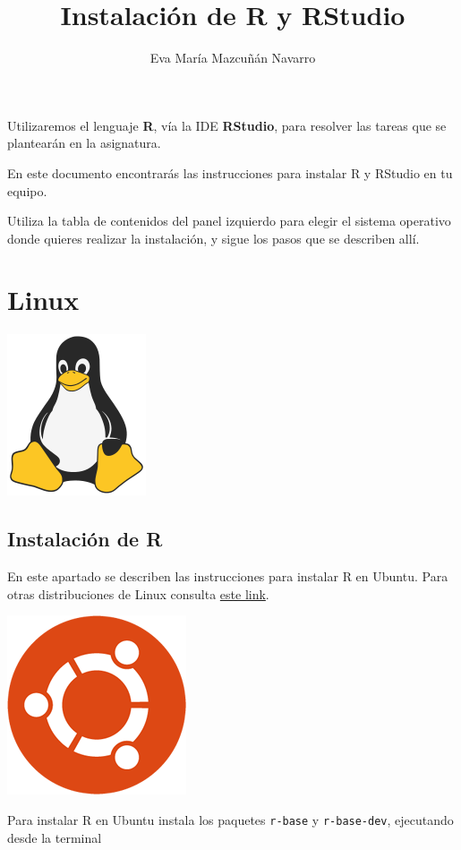 \documentclass[
  degree=mecinf,
  title=normal,
  toc=normal,
  bib=normal]{mnye}
\author{%
        Eva María Mazcuñán Navarro
    }
\title{Instalación de R y RStudio}
\begin{document}

\hypertarget{section}{%
\section*{}\label{section}}

Utilizaremos el lenguaje \textbf{R}, vía la IDE \textbf{RStudio}, para resolver las tareas que se plantearán en la asignatura.

En este documento encontrarás las instrucciones para instalar R y RStudio en tu equipo.

Utiliza la tabla de contenidos del panel izquierdo para elegir el sistema operativo donde quieres realizar la instalación, y sigue los pasos que se describen allí.

\hypertarget{linux}{%
\section{Linux}\label{linux}}

\begin{center}\includegraphics[width=0.15\linewidth]{images/os/tux-flat} \end{center}

\hypertarget{instalaciuxf3n-de-r}{%
\subsection{Instalación de R}\label{instalaciuxf3n-de-r}}

En este apartado se describen las instrucciones para instalar R en Ubuntu. Para otras distribuciones de Linux consulta \href{https://ftp.cixug.es/CRAN/bin/linux/}{este link}.

\begin{center}\includegraphics[width=0.15\linewidth]{images/os/ubuntu} \end{center}

Para instalar R en Ubuntu instala los paquetes \texttt{r-base} y \texttt{r-base-dev}, ejecutando desde la terminal
\end{document}
